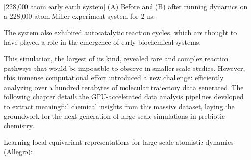 
\begin{flushleft}
\begin{multiFigure}
     \\
[228,000 atom early earth system]{
(A) Before and (B) after running dynamics on a 228,000 atom Miller experiment system for 2 ns.
}
\label{fig:228000_atom_run}
\end{multiFigure}
\end{flushleft}

The system also exhibited autocatalytic reaction cycles, which are thought to have played a role in the emergence of early biochemical systems.

This simulation, the largest of its kind, revealed rare and complex reaction pathways that would be impossible to observe in smaller-scale studies. However, this immense computational effort introduced a new challenge: efficiently analyzing over a hundred terabytes of molecular trajectory data generated. The following chapter details the GPU-accelerated data analysis pipelines developed to extract meaningful chemical insights from this massive dataset, laying the groundwork for the next generation of large-scale simulations in prebiotic chemistry.


Learning local equivariant representations for large-scale atomistic dynamics (Allegro): \cite{allegro}